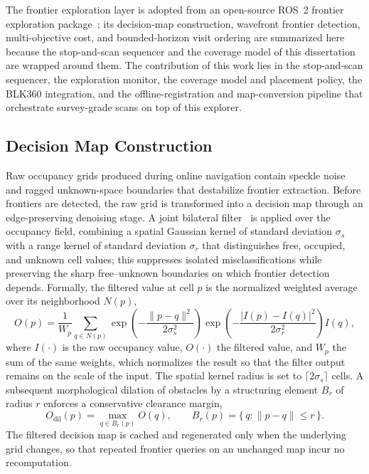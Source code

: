 The frontier exploration layer is adopted from an open-source ROS~2 frontier
exploration package~\cite{guler2024}; its decision-map construction, wavefront
frontier detection, multi-objective cost, and bounded-horizon visit ordering
are summarized here because the stop-and-scan sequencer and the coverage model
of this dissertation are wrapped around them. The contribution of this work
lies in the stop-and-scan sequencer, the exploration monitor, the coverage
model and placement policy, the BLK360 integration, and the
offline-registration and map-conversion pipeline that orchestrate survey-grade
scans on top of this explorer.

\subsection{Decision Map Construction}
\label{subsec:decision-map}

Raw occupancy grids produced during online navigation contain speckle noise and
ragged unknown-space boundaries that destabilize frontier extraction. Before
frontiers are detected, the raw grid is transformed into a decision map through
an edge-preserving denoising stage. A joint bilateral filter~\cite{tomasi1998}
is applied over the occupancy field, combining a spatial Gaussian kernel of
standard deviation $\sigma_s$ with a range kernel of standard deviation
$\sigma_r$ that distinguishes free, occupied, and unknown cell values; this
suppresses isolated misclassifications while preserving the sharp
free--unknown boundaries on which frontier detection depends. Formally, the
filtered value at cell $p$ is the normalized weighted average over its
neighborhood $N(p)$,
\begin{equation}
  O(p) = \frac{1}{W_p}\sum_{q\in N(p)}
    \exp\!\left(-\frac{\lVert p-q\rVert^2}{2\sigma_s^2}\right)
    \exp\!\left(-\frac{\lvert I(p)-I(q)\rvert^2}{2\sigma_r^2}\right) I(q),
  \label{eq:bilateral}
\end{equation}
where $I(\cdot)$ is the raw occupancy value, $O(\cdot)$ the filtered value, and
$W_p$ the sum of the same weights, which normalizes the result so that the
filter output remains on the scale of the input. The spatial kernel radius is
set to $\lceil 2\sigma_s\rceil$ cells. A subsequent morphological dilation of
obstacles by a structuring element $B_r$ of radius $r$ enforces a conservative
clearance margin,
\begin{equation}
  O_{\mathrm{dil}}(p) = \max_{q\in B_r(p)} O(q),
  \qquad B_r(p)=\{\,q:\lVert p-q\rVert\le r\,\}.
  \label{eq:dilation}
\end{equation}
The filtered decision map is cached and regenerated only when the underlying
grid changes, so that repeated frontier queries on an unchanged map incur no
recomputation.


